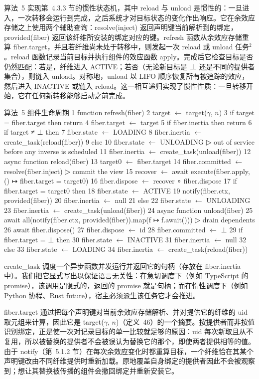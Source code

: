 算法~5 实现第~4.3.3 节的惯性状态机，其中 reload 与 unload 是惯性的：一旦进入，一次转移会运行到完成，之后系统才对目标状态的变化作出响应。它在余效应存储之上使用两个辅助查询：resolve(inject) 返回声明键当前解析到的绑定，provided(fiber) 返回该纤维所安装的绑定对应的键。refresh 函数从余效应存储重算 fiber.target，并且若纤维尚未处于转移中，则发起一次 reload 或 unload 任务\(^{2}\)。reload 函数记录当前目标并执行组件的效应函数 apply。完成后它检查目标是否仍然匹配：若是，纤维进入 ACTIVE；若否（无论新目标是 ⊥ 还是不同的提供者集合），则链入 unload。对称地，unload 以 LIFO 顺序恢复所有被追踪的效应，然后进入 INACTIVE 或链入 reload。这一相互递归实现了惯性性质：一旦转移开始，它在任何新转移能够启动之前完成。

算法~5 组件生命周期
1 function refresh(fiber)
2 target $\leftarrow$ target($\gamma$, $n$)
3 if target = fiber.target then return
4 fiber.target $\leftarrow$ target
5 if fiber.inertia then return
6 if target ≠ ⊥ then
7 fiber.state $\leftarrow$ LOADING
8 fiber.inertia $\leftarrow$ create\_task(reload(fiber))
9 else
10 fiber.state $\leftarrow$ UNLOADING ▷ out of service before any inverse is scheduled
11 fiber.inertia $\leftarrow$ create\_task(unload(fiber))
12 async function reload(fiber)
13 target0 $\leftarrow$ fiber.target
14 fiber.committed $\leftarrow$ resolve(fiber.inject) ▷ commit the view
15 recover $\leftarrow$ await execute(fiber.apply, () ↦ fiber.target = target0)
16 fiber.dispose $\leftarrow$ recover ∘ fiber.dispose
17 if fiber.target = target0 then
18 fiber.state $\leftarrow$ ACTIVE
19 notify(fiber.ctx, provided(fiber))
20 fiber.inertia $\leftarrow$ null
21 else
22 fiber.state $\leftarrow$ UNLOADING
23 fiber.inertia $\leftarrow$ create\_task(unload(fiber))
24 async function unload(fiber)
25 await all(notify(fiber.ctx, provided(fiber)).map(f ↦ f.await())) ▷ drain dependents
26 await fiber.dispose()
27 fiber.dispose $\leftarrow$ id
28 fiber.committed $\leftarrow$ ⊥
29 if fiber.target = ⊥ then
30 fiber.state $\leftarrow$ INACTIVE
31 fiber.inertia $\leftarrow$ null
32 else
33 fiber.state $\leftarrow$ LOADING
34 fiber.inertia $\leftarrow$ create\_task(reload(fiber))

create\_task 调度一个异步函数并发运行并返回它的句柄（存放在 fiber.inertia 中）。我们把它显式写出以保证语言无关性：在急切调度下（例如 TypeScript 的 promise），该调用是隐式的，返回的 promise 就是句柄；而在惰性调度下（例如 Python 协程、Rust future），宿主必须派生该任务它才会推进。

fiber.target 通过把每个声明键对当前余效应存储解析、并对提供它的纤维的 uid 取元组来计算，因此它是 target(\(\gamma\), \(n\))（定义~46）的一个摘要。按提供者而非按值识别绑定，正是使一次对记录目标的单一比较就足够的原因：uid 每次新取且从不复用，所以被替换的提供者不会被误认为替换它的那个，即使两者提供相等的值。由于 notify（第~5.1.2 节）在每次余效应变化时都重算目标，一个纤维恰在其某个声明键改由不同纤维提供时重新加载。原地覆盖自身绑定的提供者因此不会被观察到；想让其替换被传播的组件会撤回绑定并重新安装它。

